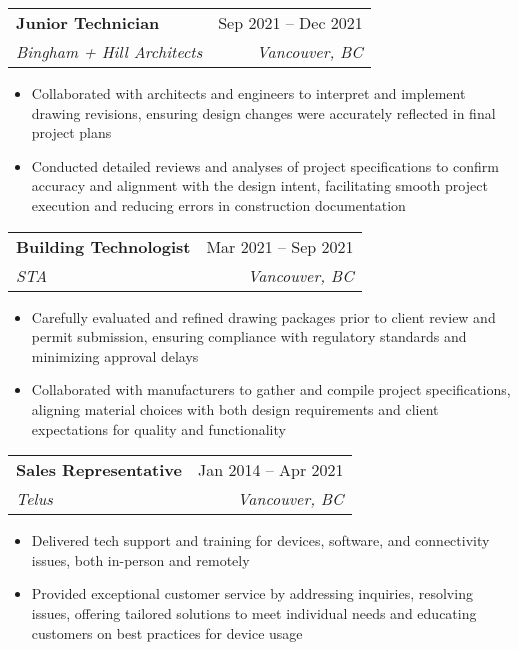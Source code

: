 \documentclass[letterpaper,11pt]{article}
\makeatletter
\newcommand{\resumeItem}[1]{
  \item\small{
    {#1 \vspace{-2pt}}
  }
}
\newcommand{\resumeSubheading}[4]{
  \vspace{-2pt}\item
    \begin{tabular*}{0.97\textwidth}[t]{l@{\extracolsep{\fill}}r}
      \textbf{#1} & #2 \\
      \textit{\small#3} & \textit{\small #4} \\
    \end{tabular*}\vspace{-7pt}
}
\newcommand{\resumeItemListStart}{\begin{itemize}}
\newcommand{\resumeItemListEnd}{\end{itemize}\vspace{-5pt}}
\makeatother
\begin{document}
\resumeSubheading
{Junior Technician}{Sep 2021 -- Dec 2021}
{Bingham + Hill Architects}{Vancouver, BC}
\resumeItemListStart
\resumeItem{Collaborated with architects and engineers to interpret and implement drawing revisions, ensuring design changes were accurately reflected in final project plans}
\resumeItem{Conducted detailed reviews and analyses of project specifications to confirm accuracy and alignment with the design intent, facilitating smooth project execution and reducing errors in construction documentation}
\resumeItemListEnd

\resumeSubheading
{Building Technologist}{Mar 2021 -- Sep 2021}
{STA}{Vancouver, BC}
\resumeItemListStart
\resumeItem{Carefully evaluated and refined drawing packages prior to client review and permit submission, ensuring compliance with regulatory standards and minimizing approval delays}
\resumeItem{Collaborated with manufacturers to gather and compile project specifications, aligning material choices with both design requirements and client expectations for quality and functionality}
\resumeItemListEnd

\resumeSubheading
{Sales Representative}{Jan 2014 -- Apr 2021}
{Telus}{Vancouver, BC}
\resumeItemListStart
\resumeItem{Delivered tech support and training for devices, software, and connectivity issues, both in-person and remotely}
\resumeItem{Provided exceptional customer service by addressing inquiries, resolving issues, offering tailored solutions to meet individual needs and educating customers on best practices for device usage}
\resumeItemListEnd


\end{document}
